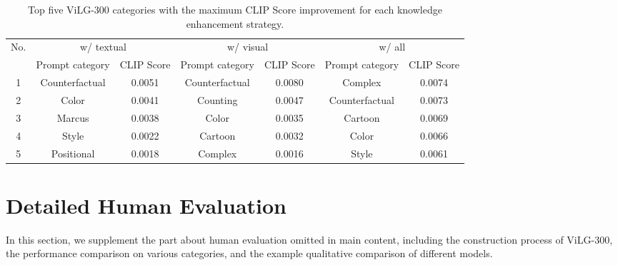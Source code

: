 \documentclass[10pt,twocolumn,letterpaper]{article}
\begin{document}
\begin{table*}[t]
  \small
  \centering
  \caption{Top five ViLG-300 categories with the maximum CLIP Score improvement for each knowledge enhancement strategy.}
    \begin{tabular}{ccccccc}
    \toprule
    \multicolumn{1}{c}{\multirow{2}[4]{*}{No.}} & \multicolumn{2}{c}{w/ textual} & \multicolumn{2}{c}{w/ visual} & \multicolumn{2}{c}{w/ all} \\
\cmidrule{2-7}    \multicolumn{1}{c}{} & Prompt category & \multicolumn{1}{c}{CLIP Score} & Prompt category & \multicolumn{1}{c}{CLIP Score} & Prompt category & CLIP Score \\
    \midrule
    1     & Counterfactual & 0.0051  & Counterfactual & 0.0080  & Complex & 0.0074  \\
    2     & Color  & 0.0041  & Counting & 0.0047  & Counterfactual & 0.0073  \\
    3     & Marcus & 0.0038  & Color  & 0.0035  & Cartoon & 0.0069  \\
    4     & Style & 0.0022  & Cartoon & 0.0032  & Color  & 0.0066  \\
    5     & Positional & 0.0018  & Complex & 0.0016  & Style & 0.0061  \\
    \bottomrule
    \end{tabular}\label{tab:vilg300-clip}\end{table*}



\section{Detailed Human Evaluation}\label{appx:human}

In this section, we supplement the part about human evaluation omitted in main content, including the construction process of ViLG-300, the performance comparison on various categories, and the example qualitative comparison of different models.
\end{document}

